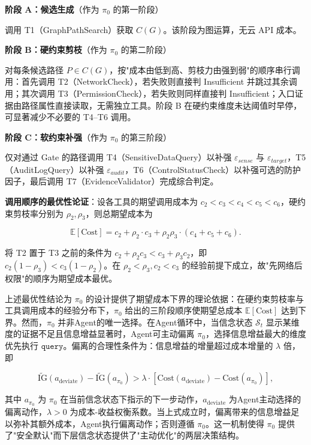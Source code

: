 \documentclass[a4paper,12pt]{ctexart}
\begin{document}
\textbf{阶段 A：候选生成}（作为 $\pi_0$ 的第一阶段）

调用 T1（GraphPathSearch）获取 $C(G)$。该阶段为图运算，无云 API 成本。

\textbf{阶段 B：硬约束剪枝}（作为 $\pi_0$ 的第二阶段）

对每条候选路径 $P \in C(G)$，按"成本由低到高、剪枝力由强到弱"的顺序串行调用：首先调用 T2（NetworkCheck），若失败则直接判 Insufficient 并跳过其余调用；其次调用 T3（PermissionCheck），若失败则同样直接判 Insufficient；入口证据由路径属性直接读取，无需独立工具。阶段 B 在硬约束维度未达阈值时早停，可显著减少不必要的 T4–T6 调用。

\textbf{阶段 C：软约束补强}（作为 $\pi_0$ 的第三阶段）

仅对通过 Gate 的路径调用 T4（SensitiveDataQuery）以补强 $\varepsilon_{sense}$ 与 $\varepsilon_{target}$，T5（AuditLogQuery）以补强 $\varepsilon_{audit}$，T6（ControlStatusCheck）以补强可选的防护因子，最后调用 T7（EvidenceValidator）完成综合判定。

\textbf{调用顺序的最优性论证}：设各工具的期望调用成本为 $c_2 < c_3 < c_4 < c_5 < c_6$，硬约束剪枝率分别为 $\rho_2, \rho_3$，则总期望成本为

\[
\mathbb{E}[\text{Cost}] = c_2 + \rho_2 \cdot c_3 + \rho_2 \rho_3 \cdot (c_4 + c_5 + c_6).
\]

将 T2 置于 T3 之前的条件为 $c_2 + \rho_2 c_3 < c_3 + \rho_3 c_2$，即 $c_2(1 - \rho_3) < c_3(1 - \rho_2)$。在 $\rho_2 < \rho_3, c_2 < c_3$ 的经验前提下成立，故"先网络后权限"的顺序为期望成本最优。

上述最优性结论为 $\pi_0$ 的设计提供了期望成本下界的理论依据：在硬约束剪枝率与工具调用成本的经验分布下，$\pi_0$ 给出的三阶段顺序使期望总成本 $\mathbb{E}[\text{Cost}]$ 达到下界。然而，$\pi_0$ 并非Agent的唯一选择。在Agent循环中，当信念状态 $\mathcal{S}_t$ 显示某维度的证据不足且信息增益显著时，Agent可主动偏离 $\pi_0$，选择信息增益最大的维度优先执行 $\texttt{query}$。偏离的合理性条件为：信息增益的增量超过成本增量的 $\lambda$ 倍，即

\[
\widetilde{\text{IG}}(a_{\text{deviate}}) - \widetilde{\text{IG}}(a_{\pi_0}) > \lambda \cdot \left[\text{Cost}(a_{\text{deviate}}) - \text{Cost}(a_{\pi_0})\right],
\]

其中 $a_{\pi_0}$ 为 $\pi_0$ 在当前信念状态下指示的下一步动作，$a_{\text{deviate}}$ 为Agent主动选择的偏离动作，$\lambda > 0$ 为成本-收益权衡系数。当上式成立时，偏离带来的信息增益足以弥补其额外成本，Agent执行偏离动作；否则遵循 $\pi_0$。这一机制使得 $\pi_0$ 提供了"安全默认"而下层信念状态提供了"主动优化"的两层决策结构。
\end{document}
